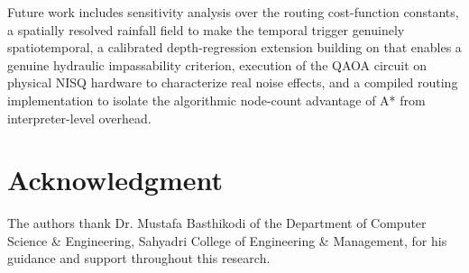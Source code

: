 \documentclass[conference]{IEEEtran}
\begin{document}
Future work includes sensitivity analysis over the routing cost-function constants, a spatially resolved rainfall field to make the temporal trigger genuinely spatiotemporal, a calibrated depth-regression extension building on \cite{sadhwani2026} that enables a genuine hydraulic impassability criterion, execution of the QAOA circuit on physical NISQ hardware to characterize real noise effects, and a compiled routing implementation to isolate the algorithmic node-count advantage of A* from interpreter-level overhead.

\section*{Acknowledgment}
The authors thank Dr. Mustafa Basthikodi of the Department of Computer Science \& Engineering, Sahyadri College of Engineering \& Management, for his guidance and support throughout this research.
\end{document}
